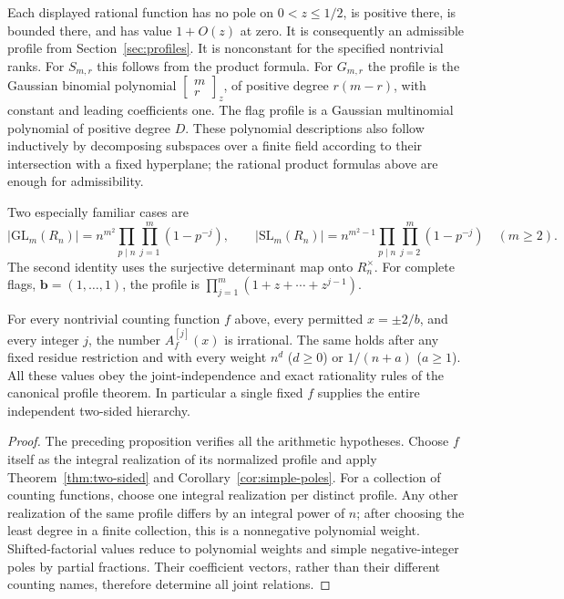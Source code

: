 Each displayed rational function has no pole on $0<z\le1/2$, is positive
there, is bounded there, and has value $1+O(z)$ at zero.  It is consequently
an admissible profile from Section~\ref{sec:profiles}.  It is nonconstant
for the specified nontrivial ranks.  For $S_{m,r}$ this follows from the
product formula.  For $G_{m,r}$ the profile is the Gaussian binomial
polynomial $\left[\begin{smallmatrix}m\\r\end{smallmatrix}\right]_z$,
of positive degree $r(m-r)$, with constant and leading coefficients one.
The flag profile is a Gaussian multinomial polynomial of positive degree
$D$.  These polynomial descriptions also follow inductively by decomposing
subspaces over a finite field according to their intersection with a fixed
hyperplane; the rational product formulas above are enough for admissibility.

Two especially familiar cases are
\[
 |\mathrm{GL}_m(R_n)|
   =n^{m^2}\prod_{p\mid n}\prod_{j=1}^{m}(1-p^{-j}),
 \qquad
 |\mathrm{SL}_m(R_n)|
   =n^{m^2-1}\prod_{p\mid n}\prod_{j=2}^{m}(1-p^{-j})
 \quad(m\ge2).
\]
The second identity uses the surjective determinant map onto $R_n^\times$.
For complete flags, $\mathbf b=(1,\ldots,1)$, the profile is
$\prod_{j=1}^{m}(1+z+\cdots+z^{j-1})$.

\begin{corollary}
\label{cor:v5-geometric-irrationality}
For every nontrivial counting function $f$ above, every permitted
$x=\pm2/b$, and every integer $j$, the number $A_f^{[j]}(x)$ is irrational.
The same holds after any fixed residue restriction and with every weight
$n^d$ ($d\ge0$) or $1/(n+a)$ ($a\ge1$).  All these values obey the
joint-independence and exact rationality rules of the canonical profile
theorem.  In particular a single fixed $f$ supplies the entire independent
two-sided hierarchy.
\end{corollary}
\begin{proof}
The preceding proposition verifies all the arithmetic hypotheses.
Choose $f$ itself as the integral realization of its normalized profile
and apply Theorem~\ref{thm:two-sided} and
Corollary~\ref{cor:simple-poles}.  For a collection of counting functions,
choose one integral realization per distinct profile.  Any other
realization of the same profile differs by an integral power of $n$;
after choosing the least degree in a finite collection, this is a
nonnegative polynomial weight.  Shifted-factorial values reduce to
polynomial weights and simple negative-integer poles by partial fractions.
Their coefficient vectors, rather than their different counting names,
therefore determine all joint relations.
\end{proof}

